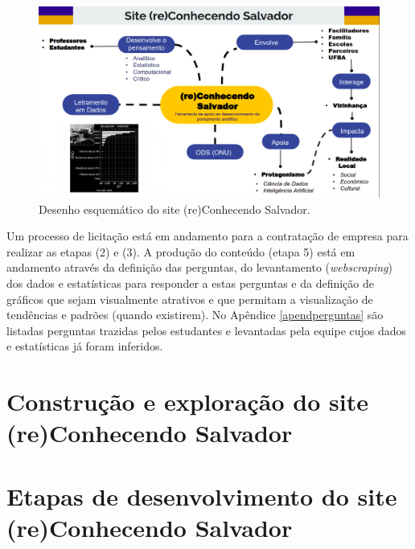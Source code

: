 \documentclass[
]{book}
\begin{document}
\begin{figure}
\includegraphics[width=18.97in]{images/mapaconceitualressa} \caption{Desenho esquemático do site (re)Conhecendo Salvador.}\label{fig:recossa}
\end{figure}

Um processo de licitação está em andamento para a contratação de empresa para realizar as etapas (2) e (3). A produção do conteúdo (etapa 5) está em andamento através da definição das perguntas, do levantamento (\emph{webscraping}) dos dados e estatísticas para responder a estas perguntas e da definição de gráficos que sejam visualmente atrativos e que permitam a visualização de tendências e padrões (quando existirem). No Apêndice \ref{apendperguntas} são listadas perguntas trazidas pelos estudantes e levantadas pela equipe cujos dados e estatísticas já foram inferidos.

\hypertarget{construuxe7uxe3o-e-explorauxe7uxe3o-do-site-reconhecendo-salvador}{%
\section{Construção e exploração do site (re)Conhecendo Salvador}\label{construuxe7uxe3o-e-explorauxe7uxe3o-do-site-reconhecendo-salvador}}

\hypertarget{etapas-de-desenvolvimento-do-site-reconhecendo-salvador}{%
\section{Etapas de desenvolvimento do site (re)Conhecendo Salvador}\label{etapas-de-desenvolvimento-do-site-reconhecendo-salvador}}
\end{document}

